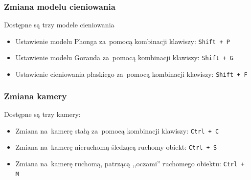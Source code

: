 \documentclass[11pt, a4paper, oneside]{scrartcl}
\begin{document}
\subsubsection{Zmiana modelu cieniowania}
Dostępne są trzy modele cieniowania
\begin{itemize}
	\item Ustawienie modelu Phonga za~pomocą kombinacji klawiszy: \texttt{Shift + P}
	\item Ustawienie modelu Gorauda za~pomocą kombinacji klawiszy: \texttt{Shift + G}
	\item Ustawienie cieniowania płaskiego za~pomocą kombinacji klawiszy: \texttt{Shift + F}
\end{itemize}
\subsubsection{Zmiana kamery}
Dostępne są trzy kamery:
\begin{itemize}
	\item Zmiana na~kamerę stałą za~pomocą kombinacji klawiszy: \texttt{Ctrl + C}
	\item Zmiana na~kamerę nieruchomą śledzącą ruchomy obiekt: \texttt{Ctrl + S}
	\item Zmiana na~kamerę ruchomą, patrzącą ,,oczami'' ruchomego obiektu: \texttt{Ctrl + M}
\end{itemize}
\end{document}
